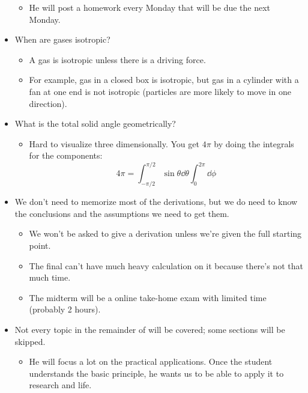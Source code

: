 \documentclass[../notes.tex]{subfiles}
\begin{document}
\begin{itemize}
\begin{itemize}
        \item He will post a homework every Monday that will be due the next Monday.
    \end{itemize}
    \item When are gases isotropic?
    \begin{itemize}
        \item A gas is isotropic unless there is a driving force.
        \item For example, gas in a closed box is isotropic, but gas in a cylinder with a fan at one end is not isotropic (particles are more likely to move in one direction).
    \end{itemize}
    \item What is the total solid angle geometrically?
    \begin{itemize}
        \item Hard to visualize three dimensionally. You get $4\pi$ by doing the integrals for the components:
        \begin{equation*}
            4\pi = \int_{-\pi/2}^{\pi/2}\sin\theta\dd{\theta}\int_0^{2\pi}\dd{\phi}
        \end{equation*}
    \end{itemize}
    \item We don't need to memorize most of the derivations, but we do need to know the conclusions and the assumptions we need to get them.
    \begin{itemize}
        \item We won't be asked to give a derivation unless we're given the full starting point.
        \item The final can't have much heavy calculation on it because there's not that much time.
        \item The midterm will be a online take-home exam with limited time (probably 2 hours).
    \end{itemize}
    \item Not every topic in the remainder of \textcite{bib:McQuarrieSimon} will be covered; some sections will be skipped.
    \begin{itemize}
        \item He will focus a lot on the practical applications. Once the student understands the basic principle, he wants us to be able to apply it to research and life.
    \end{itemize}
\end{itemize}
\end{document}
